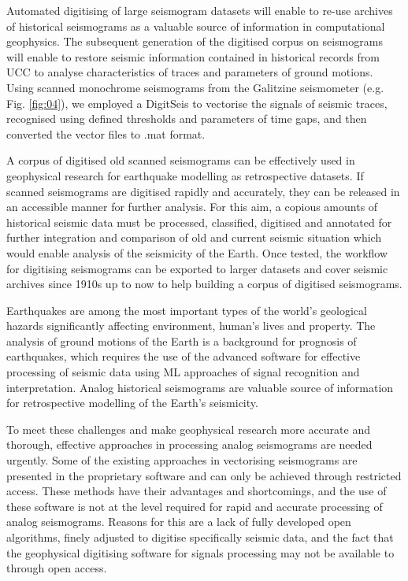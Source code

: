\documentclass[informatics,article,submit,moreauthors,pdftex]{Definitions/mdpi}
\begin{document}
Automated digitising of large seismogram datasets will enable to re-use archives of historical seismograms as a valuable source of information in computational geophysics. The subsequent generation of the digitised corpus on seismograms will enable to restore seismic information contained in historical records from \ac{UCC} to analyse characteristics of traces and parameters of ground motions. Using scanned monochrome seismograms from the Galitzine seismometer (e.g. Fig. \ref{fig:04}), we employed a DigitSeis to vectorise the signals of seismic traces, recognised using defined thresholds and parameters of time gaps, and then converted the vector files to .mat format.  

A corpus of digitised old scanned seismograms can be effectively used in geophysical research for earthquake modelling as retrospective datasets. If scanned seismograms are digitised rapidly and accurately, they can be released in an accessible manner for further analysis. For this aim, a copious amounts of historical seismic data must be processed, classified, digitised and annotated for further integration and comparison of old and current seismic situation which would enable analysis of the seismicity of the Earth. Once tested, the workflow for digitising seismograms can be exported to larger datasets and cover seismic archives since 1910s up to now to help building a corpus of digitised seismograms. 

Earthquakes are among the most important types of the world's geological hazards significantly affecting environment, human's lives and property. The analysis of ground motions of the Earth is a background for prognosis of earthquakes, which requires the use of the advanced software for effective processing of seismic data using \ac{ML} approaches of signal recognition and interpretation. Analog historical seismograms are valuable source of information for retrospective modelling of the Earth's seismicity. 

To meet these challenges and make geophysical research more accurate and thorough, effective approaches in processing analog seismograms are needed urgently. Some of the existing approaches in vectorising seismograms are presented in the proprietary software and can only be achieved through restricted access. These methods have their advantages and shortcomings, and the use of these software is not at the level required for rapid and accurate processing of analog seismograms. Reasons for this are a lack of fully developed open algorithms, finely adjusted to digitise specifically seismic data, and the fact that the geophysical digitising software for signals processing may not be available to through open access. 
\end{document}
